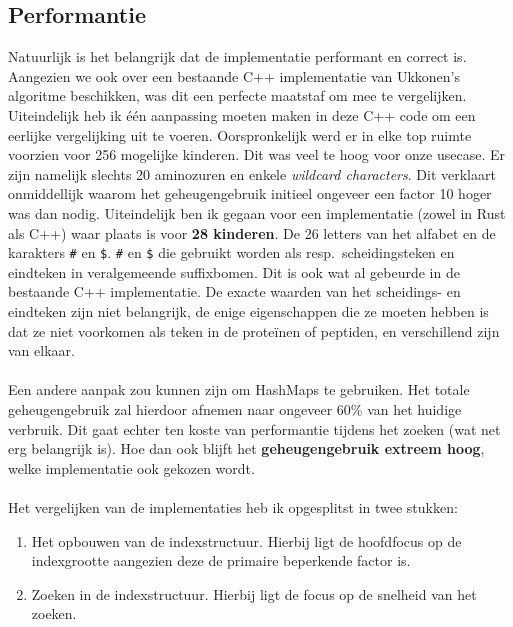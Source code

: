 \subsection{Performantie}\label{subsec:performantie}
Natuurlijk is het belangrijk dat de implementatie performant en correct is.
Aangezien we ook over een bestaande C++ implementatie van Ukkonen's algoritme beschikken, was dit een perfecte maatstaf om mee te vergelijken.
Uiteindelijk heb ik één aanpassing moeten maken in deze C++ code om een eerlijke vergelijking uit te voeren.
Oorspronkelijk werd er in elke top ruimte voorzien voor 256 mogelijke kinderen.
Dit was veel te hoog voor onze usecase.
Er zijn namelijk slechts 20 aminozuren en enkele \textit{wildcard characters}.
Dit verklaart onmiddellijk waarom het geheugengebruik initieel ongeveer een factor 10 hoger was dan nodig.
Uiteindelijk ben ik gegaan voor een implementatie (zowel in Rust als C++) waar plaats is voor \textbf{28 kinderen}.
De 26 letters van het alfabet en de karakters \texttt{\#} en \texttt{\$}.
\texttt{\#} en \texttt{\$} die gebruikt worden als resp.~scheidingsteken en eindteken in veralgemeende suffixbomen.
Dit is ook wat al gebeurde in de bestaande C++ implementatie.
De exacte waarden van het scheidings- en eindteken zijn niet belangrijk, de enige eigenschappen die ze moeten hebben is dat ze niet voorkomen als teken in de proteïnen of peptiden, en verschillend zijn van elkaar.
\\ \\
Een andere aanpak zou kunnen zijn om HashMaps te gebruiken.
Het totale geheugengebruik zal hierdoor afnemen naar ongeveer 60\% van het huidige verbruik.
Dit gaat echter ten koste van performantie tijdens het zoeken (wat net erg belangrijk is).
Hoe dan ook blijft het \textbf{geheugengebruik extreem hoog}, welke implementatie ook gekozen wordt.
\\ \\
Het vergelijken van de implementaties heb ik opgesplitst in twee stukken:
\begin{enumerate}
    \item Het opbouwen van de indexstructuur.
    Hierbij ligt de hoofdfocus op de indexgrootte aangezien deze de primaire beperkende factor is.
    \item Zoeken in de indexstructuur.
    Hierbij ligt de focus op de snelheid van het zoeken.
\end{enumerate}

